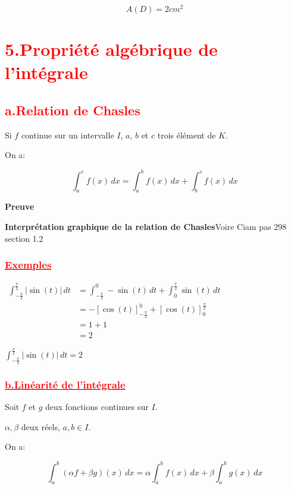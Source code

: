 \documentclass[12pt,a4paper]{article}
\begin{document}
\[\boxed{A(D)=2cm^{2}}\]   

\section*{\textbf{\textcolor{red}{5.Propriété algébrique de l'intégrale}}}
\subsection*{\textbf{\textcolor{red}{a.Relation de Chasles}}}

Si  \( f \) continue sur un intervalle  \( I \), $a$, $b$ et $c$ trois élément de $K$.

On a:

\[
\int_a^c f(x) \, dx = \int_a^b f(x) \, dx + \int_b^c f(x) \, dx
\]


\textbf{Preuve}

\textbf{Interprétation graphique de la relation de Chasles}Voire Ciam pas 298 section 1.2  

\subsubsection*{\underline{\textbf{\textcolor{red}{Exemples}}}}

\(
\begin{aligned}
\int_{-\frac{\pi}{2}}^{\frac{\pi}{2}} \left| \sin(t) \right| \, dt &= \int_{-\frac{\pi}{2}}^{0} -\sin(t) \, dt + \int_{0}^{\frac{\pi}{2}} \sin(t) \, dt\\
&= -\left[\cos(t) \right]_{-\frac{\pi}{2}}^{0} + \left[ \cos(t) \right]_{0}^{\frac{\pi}{2}}\\
&=1+1\\
&=2
\end{aligned}
\)

\( \int_{-\frac{\pi}{2}}^{\frac{\pi}{2}} \left| \sin(t) \right| \, dt = 2 \)

\subsubsection*{\underline{\textbf{\textcolor{red}{b.Linéarité de l'intégrale}}}}

Soit \( f \) et \( g \) deux fonctions continues sur \( I \). 

\( \alpha, \beta \) deux réels,  \( a, b \in I \).

On a:

\[
\boxed{\int_a^b \left( \alpha f + \beta g \right)(x) \, dx = \alpha \int_a^b f(x) \, dx + \beta \int_a^b g(x) \, dx}
\]
\end{document}
